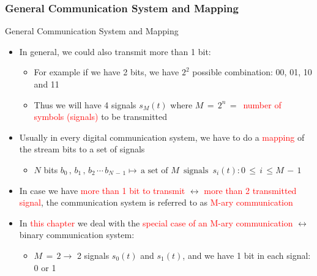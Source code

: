 \documentclass{Beamer}
\begin{document}
\subsubsection{General Communication System and Mapping}
\begin{frame}[t,allowframebreaks]{General Communication System and Mapping}

\begin{itemize}

\item In general, we could also transmit more than 1 bit:

	\begin{itemize}
	\item For example if we have 2 bits, we have $2^2$ possible combination: 00, 01, 10 and 11
	
	\item Thus we will have 4 signals $s_M(t)$ where $M \, = \, 2^n \, = \, $ \textcolor{red}{number of symbols (signals)} to be transmitted
	\end{itemize}

\item Usually in every digital communication system, we have to do a \textcolor{red}{mapping} of the stream bits to a set of signals 

	\begin{itemize}
	\item $N$ bits $b_0 \, , \, b_1 \, , \, b_2 \, \cdots \, b_{N \, - \, 1} \mapsto \, \text{a set of  } M \, \text{ signals } {\, s_i(t): 0 \, \leq \, i \, \leq M \, - \, 1 \, }$ 
	\end{itemize}

\item In case we have \textcolor{red}{more than 1 bit to transmit} $\leftrightarrow$ \textcolor{red}{more than 2 transmitted signal}, the communication system is referred to as \textcolor{red}{M-ary communication}

\newpage
\item In \textcolor{red}{this chapter} we deal with the \textcolor{red}{special case of an M-ary communication} $\leftrightarrow$ binary communication system:

	\begin{itemize}
	\item $M \, = \, 2 \rightarrow$ 2 signals $s_0(t)$ and $s_1(t)$, and we have 1 bit in each signal: 0 or 1
	\end{itemize}	 

\end{itemize}


\end{frame}
\end{document}
